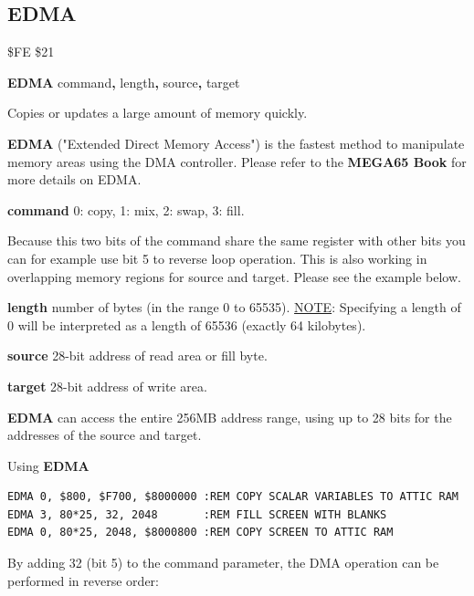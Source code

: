 \subsection{EDMA}
\label{BASIC 65 Commands!EDMA}
\begin{description}[leftmargin=2cm,style=nextline]
\item [Token:] \$FE \$21
\item [Format:] {\bf EDMA} command{\bf,} length{\bf,} source{\bf,}
                 target
\item [Usage:]
   Copies or updates a large amount of memory quickly.

   {\bf EDMA} ("Extended Direct Memory Access") is the fastest method
   to manipulate memory areas using the DMA controller. Please refer to
\ifdefined\printmanual
the {\bf MEGA65 Book}
\else
{}
\fi
   for more details on EDMA.

   {\bf command} 0: copy, 1: mix, 2: swap, 3: fill.

   Because this two bits of the command share the same register with other
   bits you can for example use bit 5 to reverse loop operation. This is
   also working in overlapping memory regions for source and target. Please
   see the example below.

    {\bf length} number of bytes (in the range 0 to 65535). \underline{NOTE}: Specifying a length of 0 will be interpreted as a length of 65536 (exactly 64 kilobytes).

   {\bf source}  28-bit address of read area or fill byte.

   {\bf target} 28-bit address of write area.

\item [Remarks:]
{\bf EDMA} can access the entire 256MB address range,
using up to 28 bits for the addresses of the source and target.
\item [Examples:] Using {\bf EDMA}
\begin{tcolorbox}[colback=black,coltext=white]
\verbatimfont{\codefont}
\begin{verbatim}
EDMA 0, $800, $F700, $8000000 :REM COPY SCALAR VARIABLES TO ATTIC RAM
EDMA 3, 80*25, 32, 2048       :REM FILL SCREEN WITH BLANKS
EDMA 0, 80*25, 2048, $8000800 :REM COPY SCREEN TO ATTIC RAM
\end{verbatim}
\end{tcolorbox}

   By adding 32 (bit 5) to the command parameter, the DMA operation can be
   performed in reverse order:


\end{description}

